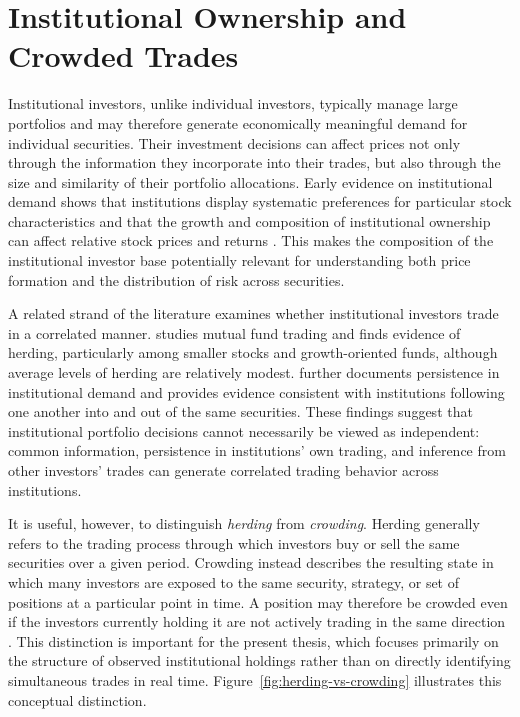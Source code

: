 \section{Institutional Ownership and Crowded Trades}
\label{sec:crowded_trades}

Institutional investors, unlike individual investors, typically manage large portfolios and may therefore generate economically meaningful demand for individual securities. Their investment decisions can affect prices not only through the information they incorporate into their trades, but also through the size and similarity of their portfolio allocations. Early evidence on institutional demand shows that institutions display systematic preferences for particular stock characteristics and that the growth and composition of institutional ownership can affect relative stock prices and returns \parencite{gompers2001institutional}. This makes the composition of the institutional investor base potentially relevant for understanding both price formation and the distribution of risk across securities.

A related strand of the literature examines whether institutional investors trade in a correlated manner. \textcite{wermers1999mutual} studies mutual fund trading and finds evidence of herding, particularly among smaller stocks and growth-oriented funds, although average levels of herding are relatively modest. \textcite{sias2004institutional} further documents persistence in institutional demand and provides evidence consistent with institutions following one another into and out of the same securities. These findings suggest that institutional portfolio decisions cannot necessarily be viewed as independent: common information, persistence in institutions' own trading, and inference from other investors' trades can generate correlated trading behavior across institutions.

It is useful, however, to distinguish \emph{herding} from \emph{crowding}. Herding generally refers to the trading process through which investors buy or sell the same securities over a given period. Crowding instead describes the resulting state in which many investors are exposed to the same security, strategy, or set of positions at a particular point in time. A position may therefore be crowded even if the investors currently holding it are not actively trading in the same direction \parencite{wermers1999mutual,brown2022crowded}. This distinction is important for the present thesis, which focuses primarily on the structure of observed institutional holdings rather than on directly identifying simultaneous trades in real time. Figure~\ref{fig:herding-vs-crowding} illustrates this conceptual distinction.

